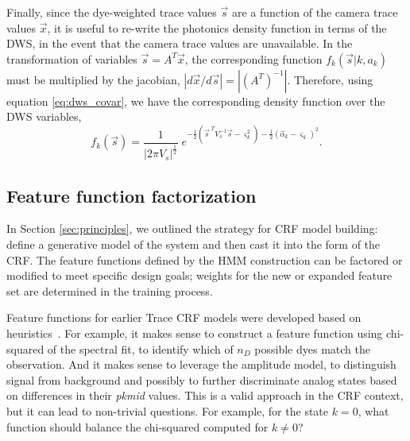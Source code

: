 \documentclass[10pt]{article}
\newcommand{\half}{\frac{1}{2}}
\newcommand{\dws}{{\small DWS}}
\newcommand{\crf}{{\small CRF}}
\newcommand{\tcrf}{Trace {\small CRF}}
\newcommand{\hmm}{{\small HMM}}
\begin{document}
Finally, since the dye-weighted trace values $\vec{s}$ are a function of the camera trace values $\vec{x}$, it is useful to re-write the photonics density function in terms of the \dws{}, in the event that the camera trace values are unavailable. In the transformation of variables $\vec{s} = A^T\vec{x}$, the corresponding function $f_k(\vec{s}|k,a_k)$ must be multiplied by the jacobian, $|d\vec{x}/d\vec{s}| = |(A^T)^{-1}|$. Therefore, using equation \eqref{eq:dws_covar}, we have the corresponding density function over the \dws{} variables,
\begin{equation}
f_k(\vec{s}) = \frac{1}{|2\pi V_s|^\half} \; e^{-\half(\vec{s}^{\;T} V_s^{-1} \vec{s} - \varsigma_k^2) -\half(\hat{\alpha}_k - \varsigma_k)^2}. 	\label{eq:full_density_dws}
\end{equation}

\subsection{Feature function factorization}
In Section \ref{sec:principles}, we outlined the strategy for \crf{} model building:
define a generative model of the system and then cast it into the form of the \crf.
The feature functions defined by the \hmm{} construction can be factored or modified to meet specific design goals;
weights for the new or expanded feature set are determined in the training process.

Feature functions for earlier \tcrf{} models were developed based on heuristics~\cite{McClurg2009}.
For example, it makes sense to construct a feature function using chi-squared of the spectral fit,
to identify which of $n_D$ possible dyes match the observation.
And it makes sense to leverage the amplitude model, to distinguish signal from background and possibly to further discriminate analog states based on differences in their \emph{pkmid} values.
This is a valid approach in the \crf{} context, but it can lead to non-trivial questions.  For example, for the state $k=0$, what function should balance the chi-squared computed for $k\neq 0$?
\end{document}
